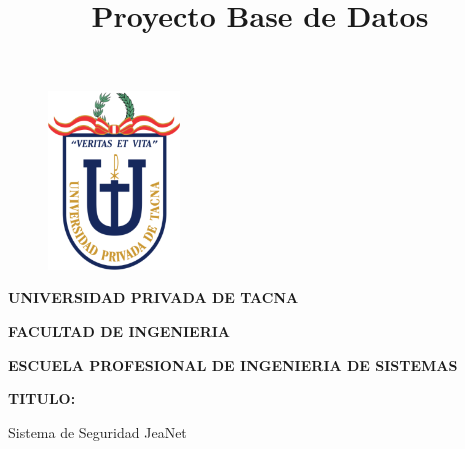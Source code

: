\documentclass[12pt,letterpaper]{article}
\begin{document}
%


\title{Proyecto Base de Datos}

\begin{titlepage}
\begin{center}
\begin{figure}[htb]
\begin{center}
\includegraphics[width=3.5cm]{./img/logo}
\end{center}
\end{figure}

\vspace*{0.15in}
\begin{Large}
\textbf{UNIVERSIDAD PRIVADA DE TACNA}\\
\end{Large}

\vspace*{0.1in}
\begin{Large}
\textbf{FACULTAD DE INGENIERIA} \\
\end{Large}

\vspace*{0.1in}
\begin{Large}
\textbf{ESCUELA PROFESIONAL DE INGENIERIA DE SISTEMAS} \\
\end{Large}

\vspace*{0.3in}
\begin{Large}
\textbf{TITULO:}\\
\end{Large}

\vspace*{0.1in}
\begin{Large}
Sistema de Seguridad JeaNet \\
\end{Large}


\end{center}
\end{titlepage}
\end{document}
